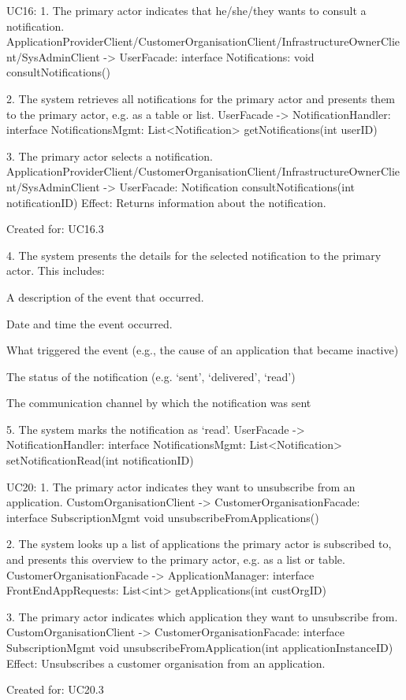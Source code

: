 {{{     UC16:
     1. The primary actor indicates that he/she/they wants to consult a notification.
            ApplicationProviderClient/CustomerOrganisationClient/InfrastructureOwnerClient/SysAdminClient -> UserFacade:
                    interface Notifications: void consultNotifications()

     2. The system retrieves all notifications for the primary actor and presents them to the primary
        actor, e.g. as a table or list.
        UserFacade -> NotificationHandler: interface NotificationsMgmt:
                List<Notification> getNotifications(int userID)


     3. The primary actor selects a notification.
            ApplicationProviderClient/CustomerOrganisationClient/InfrastructureOwnerClient/SysAdminClient -> UserFacade:
                                Notification consultNotifications(int notificationID)
            Effect: Returns information about the notification.
            \item Created for: UC16.3



     4. The system presents the details for the selected notification to the primary actor. This includes:
        { A description of the event that occurred.
        { Date and time the event occurred.
        { What triggered the event (e.g., the cause of an application that became inactive)
        { The status of the notification (e.g. `sent', `delivered', `read')
        { The communication channel by which the notification was sent


     5. The system marks the notification as `read'.
     UserFacade -> NotificationHandler: interface NotificationsMgmt:
                List<Notification> setNotificationRead(int notificationID)

     UC20:
        1. The primary actor indicates they want to unsubscribe from an application.
            CustomOrganisationClient -> CustomerOrganisationFacade: interface SubscriptionMgmt
                                              void  unsubscribeFromApplications()


        2. The system looks up a list of applications the primary actor is subscribed to, and presents this
            overview to the primary actor, e.g. as a list or table.
            CustomerOrganisationFacade -> ApplicationManager: interface FrontEndAppRequests:
                                             List<int> getApplications(int custOrgID)

        3. The primary actor indicates which application they want to unsubscribe from.
             CustomOrganisationClient -> CustomerOrganisationFacade: interface SubscriptionMgmt
                                              void  unsubscribeFromApplication(int applicationInstanceID)
             Effect: Unsubscribes a customer organisation from an application.
             \item Created for: UC20.3

}}}}}}}}
